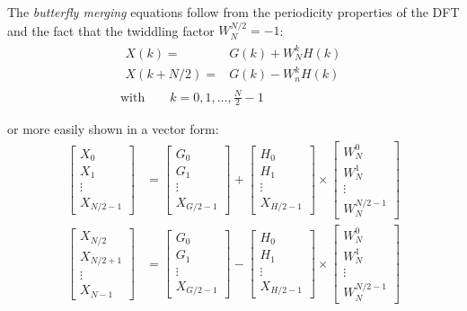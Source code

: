The \emph{butterfly merging} equations follow from the periodicity properties
of the DFT and the fact that the twiddling factor $W_N^{N/2} = -1$:
\begin{align*}
	\begin{array}{rl}
		X(k) = & G(k) + W_N^k H(k) \\
		X(k+N/2) = & G(k) - W_n^k H(k)
	\end{array} \\
	\text{with}\qquad k=0,1,\ldots,\frac{N}{2}-1
\end{align*}

or more easily shown in a vector form:
\begin{align*}
	\begin{bmatrix}	X_0 \\ X_1 \\ \vdots \\ X_{N/2-1} \end{bmatrix} &= 
	\begin{bmatrix}	G_0 \\ G_1 \\ \vdots \\ X_{G/2-1} \end{bmatrix} + 
	\begin{bmatrix}	H_0 \\ H_1 \\ \vdots \\ X_{H/2-1} \end{bmatrix} \times
	\begin{bmatrix}	W^0_N \\ W^1_N \\ \vdots \\ W^{N/2-1}_N \end{bmatrix}
	\\
	\begin{bmatrix}	X_{N/2} \\ X_{N/2+1} \\ \vdots \\ X_{N-1} \end{bmatrix} &= 
	\begin{bmatrix}	G_0 \\ G_1 \\ \vdots \\ X_{G/2-1} \end{bmatrix} -
	\begin{bmatrix}	H_0 \\ H_1 \\ \vdots \\ X_{H/2-1} \end{bmatrix} \times
	\begin{bmatrix}	W^0_N \\ W^1_N \\ \vdots \\ W^{N/2-1}_N \end{bmatrix}	
\end{align*}

